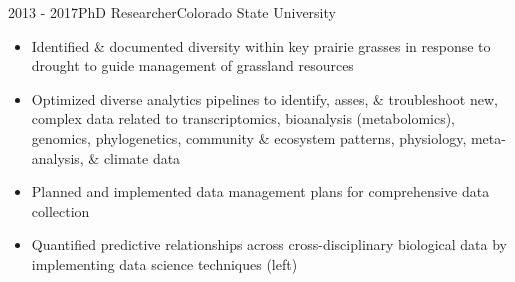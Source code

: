 \documentclass[letterpaper]{twentysecondcv} %
\begin{document}
\begin{twenty}
{{\begin{itemize}
    \end{itemize}}  \vspace{6mm}  } 



       \twentyitem
    	{2013 - }{2017}{PhD Researcher}{Colorado State University}
        	{}
        { \vspace{-1mm}
        {\begin{itemize}
        \item Identified \& documented diversity within key prairie grasses in response to drought to guide management of grassland resources 
	\item Optimized diverse analytics pipelines to identify, asses, \& troubleshoot new, complex data related to transcriptomics, bioanalysis (metabolomics), genomics, phylogenetics, community \& ecosystem patterns, physiology, meta-analysis, \& climate data
	\item Planned and implemented data management plans for comprehensive data collection
	\item Quantified predictive relationships across cross-disciplinary biological data by implementing data science techniques (left)
    \end{itemize}}  \vspace{6mm}  }

    

                
\end{twenty}
\end{document}

